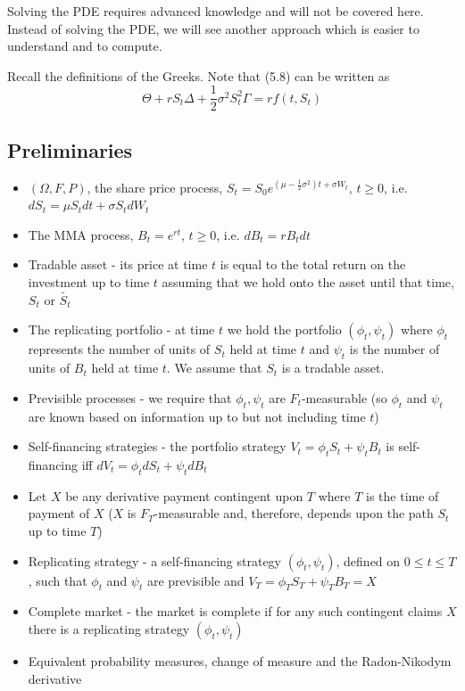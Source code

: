 \documentclass[11pt,a4paper]{book}
\theoremstyle{definition}\newtheorem{definition}{Definition}
\theoremstyle{definition}\newtheorem{fact}{Fact}
\theoremstyle{definition}\newtheorem{remark}{Remark}
\theoremstyle{definition}\newtheorem{ex}{Ex.}
\theoremstyle{definition}\newtheorem{project}{Project}
\theoremstyle{definition}\newtheorem{problem}{Problem}
\theoremstyle{definition}\newtheorem{example}{Example}
\numberwithin{theorem}{section}
\numberwithin{corollary}{chapter}
\numberwithin{assumption}{chapter}
\numberwithin{definition}{chapter}
\numberwithin{prop}{chapter}
\numberwithin{notation}{chapter}
\numberwithin{problem}{chapter}
\numberwithin{example}{chapter}
\numberwithin{fact}{chapter}
\numberwithin{ex}{chapter}
\begin{document}
Solving the PDE requires advanced knowledge and will not be covered here. Instead of solving the PDE, we will see another approach which is easier to understand and to compute.

Recall the definitions of the Greeks. Note that (5.8) can be written as
\begin{equation}
\Theta + rS_t \Delta + \frac{1}{2}\sigma^2 S_t^2 \Gamma = rf(t,S_t)
\end{equation}

\subsection{Preliminaries}

\begin{itemize}
\item $(\Omega, F, P)$, the share price process, $S_t = S_0e^{(\mu-\frac{1}{2}\sigma^2)t+\sigma W_t}$, $t \geq 0$, i.e. $dS_t = \mu S_t dt + \sigma S_t dW_t$
\item The MMA process, $B_t =e^{rt}$, $t \geq 0$, i.e. $dB_t = r B_t dt$
\item Tradable asset - its price at time $t$ is equal to the total return on the investment up to time $t$ assuming that we hold onto the asset until that time, $S_t$ or $\tilde{S_t}$
\item The replicating portfolio - at time $t$ we hold the portfolio $(\phi_t, \psi_t)$ where $\phi_t$ represents the number of units of $S_t$ held at time $t$ and $\psi_t$ is the number of units of $B_t$ held at time $t$. We assume that $S_t$ is a tradable asset.
\item Previsible processes - we require that $\phi_t, \psi_t$ are $F_t$-measurable (so $\phi_t$ and $\psi_t$ are known based on information up to but not including time $t$)
\item Self-financing strategies - the portfolio strategy $V_t = \phi_t S_t + \psi_t B_t$ is self-financing iff $dV_t = \phi_t dS_t + \psi_t dB_t$
\item Let $X$ be any derivative payment contingent upon $T$ where $T$ is the time of payment of $X$ ($X$ is $F_T$-measurable and, therefore, depends upon the path $S_t$ up to time $T$)
\item Replicating strategy - a self-financing strategy $(\phi_t, \psi_t)$, defined on $0 \leq t \leq T$, such that $\phi_t$ and $\psi_t$ are previsible and $V_T = \phi_T S_T + \psi_T B_T = X$
\item Complete market - the market is complete if for any such contingent claims $X$ there is a replicating strategy $(\phi_t, \psi_t)$
\item Equivalent probability measures, change of measure and the Radon-Nikodym derivative
\end{itemize}
\end{document}
